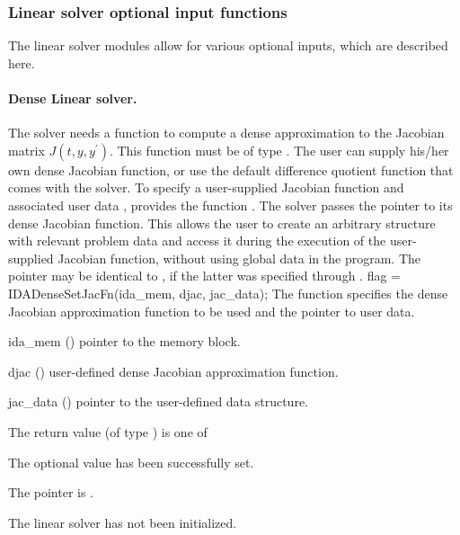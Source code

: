 \subsubsection{Linear solver optional input functions}
The linear solver modules allow for various optional inputs, which are
described here.
\noindent\paragraph{\bf Dense Linear solver.}
The 
{\idadense} solver needs a function to compute a dense approximation to
the Jacobian matrix $J(t,y,y^\prime)$.  
This function must be of type . 
The user can supply his/her own dense Jacobian function, or use the default 
difference quotient function  
that comes with the {\idadense} solver.
To specify a user-supplied Jacobian function  and associated user 
data , {\idadense} provides the function .
The {\idadense} solver passes the pointer  
to its dense Jacobian function. This allows the user to
create an arbitrary structure with relevant problem data and access it
during the execution of the user-supplied Jacobian function, without
using global data in the program.  The pointer  may be
identical to , if the latter was specified through .
{
  flag = IDADenseSetJacFn(ida\_mem, djac, jac\_data);
}
{
  The function  specifies the dense Jacobian
  approximation function to be used and the pointer to user data.
}
{
  \begin{args}
  \item[ida\_mem] ()
    pointer to the {\ida} memory block.
  \item[djac] ()
    user-defined dense Jacobian approximation function.
  \item[jac\_data] ()
    pointer to the user-defined data structure.
  \end{args}
}
{
  The return value  (of type ) is one of
  \begin{args}
  \item[\Id{IDADENSE\_SUCCESS}] 
    The optional value has been successfully set.
  \item[\Id{IDADENSE\_MEM\_NULL}]
    The  pointer is .
  \item[\Id{IDADENSE\_LMEM\_NULL}]
    The {\idadense} linear solver has not been initialized.
  \end{args}
}
